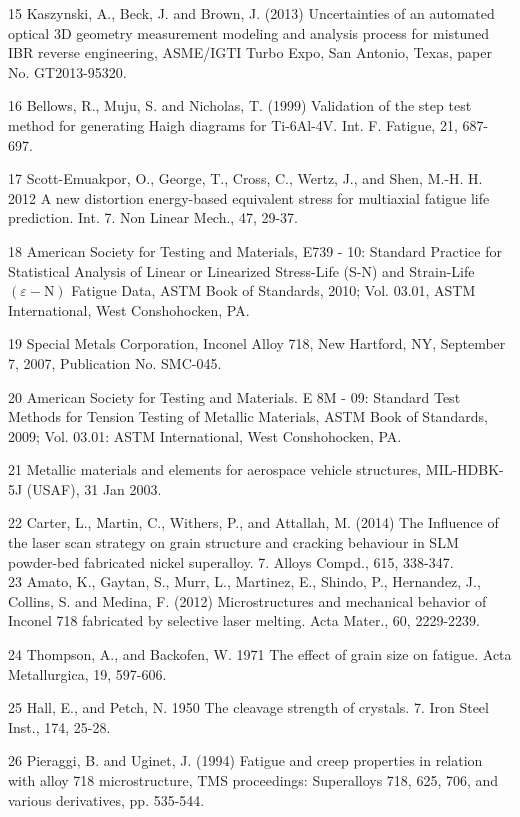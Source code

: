 \documentclass[10pt]{article}
\begin{document}
15 Kaszynski, A., Beck, J. and Brown, J. (2013) Uncertainties of an automated optical 3D geometry measurement modeling and analysis process for mistuned IBR reverse engineering, ASME/IGTI Turbo Expo, San Antonio, Texas, paper No. GT2013-95320.

16 Bellows, R., Muju, S. and Nicholas, T. (1999) Validation of the step test method for generating Haigh diagrams for Ti-6Al-4V. Int. F. Fatigue, 21, 687-697.

17 Scott-Emuakpor, O., George, T., Cross, C., Wertz, J., and Shen, M.-H. H. 2012 A new distortion energy-based equivalent stress for multiaxial fatigue life prediction. Int. 7. Non Linear Mech., 47, 29-37.

18 American Society for Testing and Materials, E739 - 10: Standard Practice for Statistical Analysis of Linear or Linearized Stress-Life (S-N) and Strain-Life $(\varepsilon-\mathrm{N})$ Fatigue Data, ASTM Book of Standards, 2010; Vol. 03.01, ASTM International, West Conshohocken, PA.

19 Special Metals Corporation, Inconel Alloy 718, New Hartford, NY, September 7, 2007, Publication No. SMC-045.

20 American Society for Testing and Materials. E 8M - 09: Standard Test Methods for Tension Testing of Metallic Materials, ASTM Book of Standards, 2009; Vol. 03.01: ASTM International, West Conshohocken, PA.

21 Metallic materials and elements for aerospace vehicle structures, MIL-HDBK-5J (USAF), 31 Jan 2003.

22 Carter, L., Martin, C., Withers, P., and Attallah, M. (2014) The Influence of the laser scan strategy on grain structure and cracking behaviour in SLM powder-bed fabricated nickel superalloy. 7. Alloys Compd., 615, 338-347.\\
23 Amato, K., Gaytan, S., Murr, L., Martinez, E., Shindo, P., Hernandez, J., Collins, S. and Medina, F. (2012) Microstructures and mechanical behavior of Inconel 718 fabricated by selective laser melting. Acta Mater., 60, 2229-2239.

24 Thompson, A., and Backofen, W. 1971 The effect of grain size on fatigue. Acta Metallurgica, 19, 597-606.

25 Hall, E., and Petch, N. 1950 The cleavage strength of crystals. 7. Iron Steel Inst., 174, 25-28.

26 Pieraggi, B. and Uginet, J. (1994) Fatigue and creep properties in relation with alloy 718 microstructure, TMS proceedings: Superalloys 718, 625, 706, and various derivatives, pp. 535-544.
\end{document}
